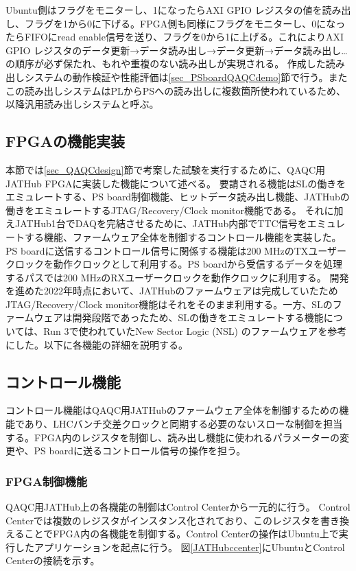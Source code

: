 Ubuntu側はフラグをモニターし、1になったらAXI GPIO レジスタの値を読み出し、フラグを1から0に下げる。FPGA側も同様にフラグをモニターし、0になったらFIFOにread enable信号を送り、フラグを0から1に上げる。これによりAXI GPIO レジスタのデータ更新→データ読み出し→データ更新→データ読み出し…の順序が必ず保たれ、もれや重複のない読み出しが実現される。
作成した読み出しシステムの動作検証や性能評価は\ref{sec_PSboardQAQCdemo}節で行う。またこの読み出しシステムはPLからPSへの読み出しに複数箇所使われているため、以降汎用読み出しシステムと呼ぶ。


\subsection{FPGAの機能実装}
\label{subsec_function}
本節では\ref{sec_QAQCdesign}節で考案した試験を実行するために、QAQC用JATHub FPGAに実装した機能について述べる。
要請される機能はSLの働きをエミュレートする、PS board制御機能、ヒットデータ読み出し機能、JATHubの働きをエミュレートするJTAG/Recovery/Clock monitor機能である。
それに加えJATHub1台でDAQを完結させるために、JATHub内部でTTC信号をエミュレートする機能、ファームウェア全体を制御するコントロール機能を実装した。
PS boardに送信するコントロール信号に関係する機能は200 MHzのTXユーザークロックを動作クロックとして利用する。PS boardから受信するデータを処理するパスでは200 MHzのRXユーザークロックを動作クロックに利用する。
開発を進めた2022年時点において、JATHubのファームウェアは完成していたためJTAG/Recovery/Clock monitor機能はそれをそのまま利用する。一方、SLのファームウェアは開発段階であったため、SLの働きをエミュレートする機能については、Run 3で使われていたNew Sector Logic (NSL) のファームウェアを参考にした。以下に各機能の詳細を説明する。

\subsection*{\textbf{コントロール機能}}
\label{subsubsec_control}
コントロール機能はQAQC用JATHubのファームウェア全体を制御するための機能であり、LHCバンチ交差クロックと同期する必要のないスローな制御を担当する。FPGA内のレジスタを制御し、読み出し機能に使われるパラメーターの変更や、PS boardに送るコントロール信号の操作を担う。

\subsubsection{FPGA制御機能}
QAQC用JATHub上の各機能の制御はControl Centerから一元的に行う。
Control Centerでは複数のレジスタがインスタンス化されており、このレジスタを書き換えることでFPGA内の各機能を制御する。Control Centerの操作はUbuntu上で実行したアプリケーションを起点に行う。
図\ref{JATHubccenter}にUbuntuとControl Centerの接続を示す。

